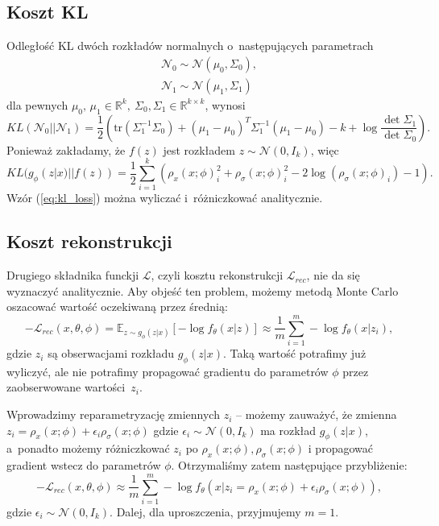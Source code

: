 \documentclass{iithesis}
\begin{document}
\subsection{Koszt KL}
Odległość KL dwóch rozkładów normalnych o~następujących parametrach
\begin{equation*}
\begin{split}
\mathcal{N}_0 \sim \mathcal{N}(\mu_0, \Sigma_0), \\
\mathcal{N}_1 \sim \mathcal{N}(\mu_1, \Sigma_1)
\end{split}
\end{equation*}
dla pewnych $\mu_0,\,\mu_1 \in \mathbb{R}^k,\ \Sigma_0, \Sigma_1 \in \mathbb{R}^{k \times k}$, wynosi
\begin{equation*}
KL(\mathcal{N}_0||\mathcal{N}_1) = \frac{1}{2} \left(\text{tr}(\Sigma_1^{-1}\Sigma_0)
+ (\mu_1-\mu_0)^T \Sigma_1^{-1} (\mu_1-\mu_0) -k + \log\frac{\det\Sigma_1}{\det\Sigma_0} \right).
\end{equation*}
Ponieważ zakładamy, że $f(z)$ jest rozkładem $z \sim \mathcal{N}(0, I_k)$, więc
\begin{equation}
KL(g_\phi(z|x) || f(z)) = \frac{1}{2}\sum_{i=1}^k
\left( \rho_x(x;\phi)_i^2 + \rho_\sigma(x;\phi)_i^2 - 2\log(\rho_\sigma(x;\phi)_i)-1 \right).
\label{eq:kl_loss}
\end{equation}
Wzór (\ref{eq:kl_loss}) można wyliczać i~różniczkować analitycznie.

\subsection{Koszt rekonstrukcji} \label{sec:rec_loss_normal}
Drugiego składnika funckji $\mathcal{L}$, czyli kosztu rekonstrukcji $\mathcal{L}_{rec}$,
nie da się wyznaczyć analitycznie. Aby objeść ten problem, możemy metodą Monte Carlo
oszacować wartość oczekiwaną przez średnią:
\begin{equation*}
-\mathcal{L}_{rec}(x,\theta,\phi) = \mathbb{E}_{z \sim g_\phi(z|x)}\left[-\log f_\theta(x|z)\right] \approx
\frac{1}{m} \sum_{i=1}^m -\log f_\theta(x|z_i),
\end{equation*}
gdzie $z_i$ są obserwacjami rozkładu $g_\phi(z|x)$. Taką wartość potrafimy już wyliczyć, ale nie
potrafimy propagować gradientu do parametrów $\phi$ przez
zaobserwowane wartości~$z_i$.

Wprowadzimy reparametryzację zmiennych $z_i$ -- możemy zauważyć, że zmienna
$z_i=\rho_x(x;\phi)+\epsilon_i\rho_\sigma(x;\phi)$
gdzie $\epsilon_i \sim \mathcal{N}(0, I_k)$
ma rozkład $g_\phi(z|x)$, a~ponadto możemy różniczkować $z_i$ po $\rho_x(x;\phi),\rho_\sigma(x;\phi)$
i propagować gradient wstecz do parametrów $\phi$.
Otrzymaliśmy zatem następujące przybliżenie:
$$
-\mathcal{L}_{rec}(x,\theta,\phi) \approx
\frac{1}{m} \sum_{i=1}^m -\log f_\theta(x|z_i=\rho_x(x;\phi)+\epsilon_i\rho_\sigma(x;\phi)),
$$
gdzie $\epsilon_i \sim \mathcal{N}(0, I_k)$. Dalej, dla uproszczenia, przyjmujemy $m=1$.
\end{document}

